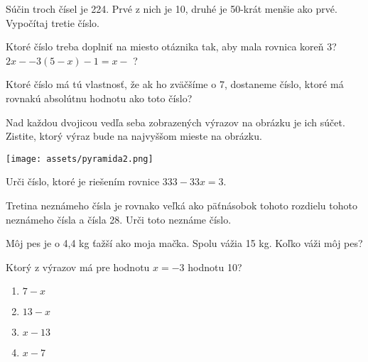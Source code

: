 \begin{example}
	Súčin troch čísel je 224. Prvé z nich je 10, druhé je 50-krát menšie ako prvé. Vypočítaj tretie číslo. 
\end{example}

\begin{example}
	Ktoré číslo treba doplniť na miesto otáznika tak, aby mala rovnica koreň 3? $2x - -3(5-x) - 1 = x - $ ?
\end{example}

\begin{example}
	Ktoré číslo má tú vlastnosť, že ak ho zväčšíme o 7, dostaneme číslo, ktoré má rovnakú absolútnu hodnotu ako toto číslo?
\end{example}

\begin{example}
	Nad každou dvojicou vedľa seba zobrazených výrazov na obrázku je ich súčet. Zistite, ktorý výraz bude na najvyššom mieste na obrázku.
	
	\begin{center}
		\texttt{[image: assets/pyramida2.png]}
	\end{center}
\end{example}

\begin{example}
	Urči číslo, ktoré je riešením rovnice $333 - 33x = 3$.
\end{example}

\begin{example}
	Tretina neznámeho čísla je rovnako veľká ako päťnásobok tohoto rozdielu tohoto neznámeho čísla a čísla 28. Urči toto neznáme číslo.
\end{example}

\begin{example}
	Môj pes je o 4,4 kg ťažší ako moja mačka. Spolu vážia 15 kg. Koľko váži môj pes?
\end{example}

\begin{example}
	Ktorý z výrazov má pre hodnotu $x = -3$ hodnotu 10?
	
	\begin{enumerate}
		\item $7 - x$
		\item $13 - x$
		\item $x - 13$
		\item $x - 7$
		
	\end{enumerate}
\end{example}


